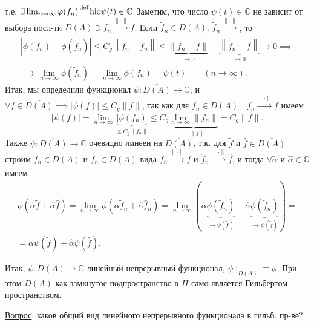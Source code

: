 \documentclass[a4paper]{article}
\begin{document}
т.\:е. $\exists \lim_{n \to \infty}\phi(f_n) \textover{=}{def} 
\mathrm{hi o}
\psi (t) \in \mathbb{C}$
Заметим, что число $\psi(t) \in \mathbb{C}$ не зависит от
выбора посл-ти $D(A) \ni f_n \xrightarrow[]{\| \cdot\|}f$.
Если $\tilde{f}_n \in D(A),\,\tilde{f}_n \xrightarrow[]{\| \cdot\|}$,
то
\begin{multline*}
	\left|\phi(f_n)- \phi \left( \tilde{f}_n \right) \right|
	\le  C_g \left\lVert  f_n - \tilde{f}_n\right\rVert\le 
	\underbrace{\| f_n - f\|}_{\to 0}+
	\underbrace{\left\lVert \tilde{f}_n - f\right\rVert}_{\to 0}\to 0 \implies \\ \implies
	\lim_{n \to \infty} \phi\left(\tilde{f}_n\right)=
	\lim_{n \to \infty} \phi(f_n) = \psi(t) \qquad
	(n\to  \infty)
.\end{multline*} 
Итак, мы определили функционал $\psi: \overline{D(A)}\to \mathbb{C}$, и $\forall f \in  \overline{D(A)} \implies |\psi(f)|\le 
 C_g \| f\|$, так как для $f_n \in D(A)\quad f_n \xrightarrow[]{\| \cdot\|} f $ имеем
 \[
	 |\psi(f)|= \lim_{n \to \infty} \underbrace{|\phi(f_n)}_{\le 
	 C_g \| f_n\|}\le C_g \underbrace{\lim_{n \to \infty} \| f_n\|}_{= \| f\|}=C_g \| f\|
 .\] 
 Также $\psi : \overline{D(A)}\to  \mathbb{C}$ очевидно линеен
 на $\overline{D(A)}$, т.\:к. для $\tilde{f}$ и $\hat{f} \in 
 \overline{D(A)}$ строим $\tilde{f}_n \in D(A)$ и 
 $\hat{f}_n \in D(A)$ вида 
 $\tilde{f}_n \xrightarrow[]{\| \cdot \|}\tilde{f}$ и $
 \hat{f}_n \xrightarrow[]{\| \cdot \|}\hat{f}$,
 и тогда $\forall \tilde{\alpha}$ и $\hat{\alpha}\in \mathbb{C}$
 имеем
\begin{multline*}
	\psi\left( \tilde{\alpha} \tilde{f}+ \hat{\alpha}
	\hat{f}\right) = \lim_{n \to \infty} \phi\left( 
\tilde{\alpha}\tilde{f}_n+ \hat{\alpha}\hat{f}_n\right) =
\lim_{n \to \infty} \left( \tilde{\alpha}\underbrace{
\phi\left( \tilde{f}_n \right) }_{\to \psi\left( \tilde{f} \right) }+\hat{\alpha} \underbrace{\phi\left( \tilde{f}_n \right) }_{\to 
\psi\left( \tilde{f} \right) } \right) =\\=
\tilde{\alpha} \psi\left( \tilde{f} \right) +
\hat{\alpha} \psi\left( \hat{f} \right) 
.\end{multline*} 

Итак, $\psi: \overline{D(A)}\to \mathbb{C}$ линейный
непрерывный функционал, $\psi\mid _{D(A)}\equiv \phi$.
При этом $\overline{D(A)}$ как замкнутое подпространство в $H$ 
само является Гильбертом пространством.

\underline{Вопрос}: каков общий вид линейного непрерывного функционала в гильб. пр-ве?
\end{document}
